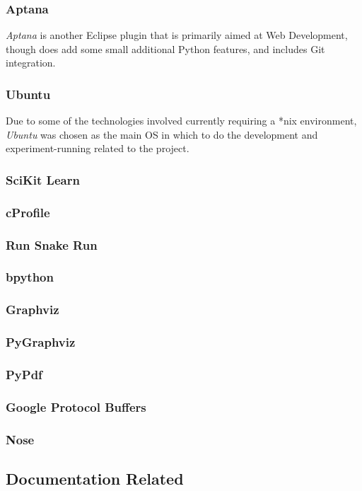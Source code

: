 \documentclass[a4paper,11pt]{report}
\begin{document}
\subsubsection*{Aptana}
\emph{Aptana} is another Eclipse plugin that is primarily aimed at Web Development, though does add some small additional Python features, and includes Git integration.

\subsubsection*{Ubuntu}
Due to some of the technologies involved currently requiring a *nix environment, \emph{Ubuntu}\cite{prog:ubuntu} was chosen as the main OS in which to do the development and experiment-running related to the project.

\subsubsection*{SciKit Learn}
\subsubsection*{cProfile}
\subsubsection*{Run Snake Run}
\subsubsection*{bpython}
\subsubsection*{Graphviz}
\subsubsection*{PyGraphviz}
\subsubsection*{PyPdf}
\subsubsection*{Google Protocol Buffers}
\subsubsection*{Nose}

\subsection{Documentation Related}
\end{document}
